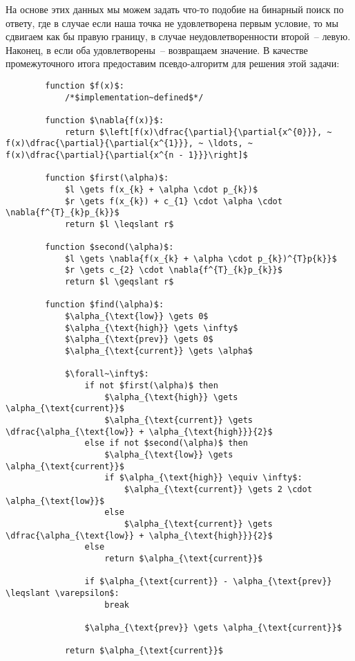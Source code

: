 \documentclass[12pt, a4paper, oneside, final]{article}
\begin{document}
	На основе этих данных мы можем задать что-то подобие на бинарный поиск по ответу, где в случае если наша точка не удовлетворена первым условие, то мы сдвигаем как бы правую границу, в случае неудовлетворенности второй~-- левую. Наконец, в если оба удовлетворены~-- возвращаем значение. В качестве промежуточного итога предоставим псевдо-алгоритм для решения этой задачи:
	\begin{lstlisting}
		function $f(x)$:
			/*$implementation~defined$*/

		function $\nabla{f(x)}$:
			return $\left[f(x)\dfrac{\partial}{\partial{x^{0}}}, ~ f(x)\dfrac{\partial}{\partial{x^{1}}}, ~ \ldots, ~ f(x)\dfrac{\partial}{\partial{x^{n - 1}}}\right]$

		function $first(\alpha)$:
			$l \gets f(x_{k} + \alpha \cdot p_{k})$
			$r \gets f(x_{k}) + c_{1} \cdot \alpha \cdot \nabla{f^{T}_{k}p_{k}}$
			return $l \leqslant r$

		function $second(\alpha)$:
			$l \gets \nabla{f(x_{k} + \alpha \cdot p_{k})^{T}p{k}}$
			$r \gets c_{2} \cdot \nabla{f^{T}_{k}p_{k}}$
			return $l \geqslant r$

		function $find(\alpha)$:
			$\alpha_{\text{low}} \gets 0$
			$\alpha_{\text{high}} \gets \infty$
			$\alpha_{\text{prev}} \gets 0$
			$\alpha_{\text{current}} \gets \alpha$

			$\forall~\infty$:
				if not $first(\alpha)$ then
					$\alpha_{\text{high}} \gets \alpha_{\text{current}}$
					$\alpha_{\text{current}} \gets \dfrac{\alpha_{\text{low}} + \alpha_{\text{high}}}{2}$
				else if not $second(\alpha)$ then
					$\alpha_{\text{low}} \gets \alpha_{\text{current}}$
					if $\alpha_{\text{high}} \equiv \infty$:
						$\alpha_{\text{current}} \gets 2 \cdot \alpha_{\text{low}}$
					else
						$\alpha_{\text{current}} \gets \dfrac{\alpha_{\text{low}} + \alpha_{\text{high}}}{2}$
				else
					return $\alpha_{\text{current}}$

				if $\alpha_{\text{current}} - \alpha_{\text{prev}} \leqslant \varepsilon$:
					break

				$\alpha_{\text{prev}} \gets \alpha_{\text{current}}$

			return $\alpha_{\text{current}}$
	\end{lstlisting}
\end{document}
